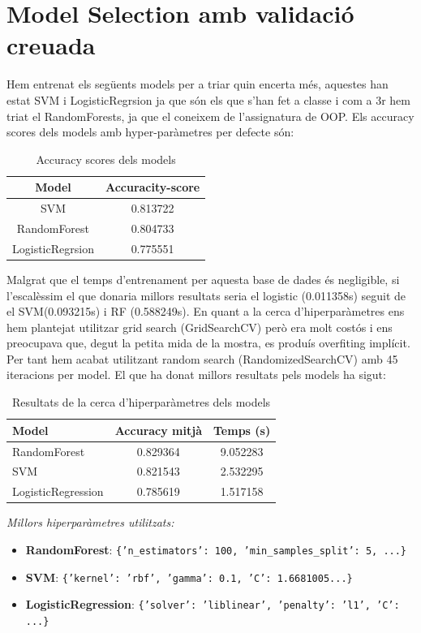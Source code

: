 \documentclass[9pt,a4paper,twoside]{tau-class/tau}
\begin{document}
\section{Model Selection amb validació creuada}
    Hem entrenat els següents models per a triar quin encerta més, aquestes han estat SVM i LogisticRegrsion ja que són els que s'han fet a classe i com a 3r hem triat el RandomForests, ja que el coneixem de l'assignatura de OOP.
    Els accuracy scores dels models amb hyper-paràmetres per defecte són:
\begin{table}[H]
		\centering
		\caption{Accuracy scores dels models}
		\label{tab:accuracy_scores}
			\begin{tabular}{cc}
			\toprule
			\textbf{Model} & \textbf{Accuracity-score}\\
			\midrule
			SVM & 0.813722\\
            RandomForest & 0.804733\\
            LogisticRegrsion & 0.775551\\
            \bottomrule
		\end{tabular}			
	\end{table}
    Malgrat que el temps d'entrenament per aquesta base de dades és negligible, si l'escalèssim el que donaria millors resultats seria el logistic (0.011358s) seguit de el SVM(0.093215s) i RF (0.588249s).
    En quant a la cerca d'hiperparàmetres ens hem plantejat utilitzar grid search (GridSearchCV) però era molt costós i ens preocupava que, degut la petita mida de la mostra, es produís overfiting implícit. Per tant hem acabat utilitzant random search (RandomizedSearchCV) amb 45 iteracions per model.
    El que ha donat millors resultats pels models ha sigut:
\begin{table}[H]
    \centering
    \caption{Resultats de la cerca d'hiperparàmetres dels models}
    \label{tab:hiperparametres}
    \begin{tabular}{lcc}
        \toprule
        \textbf{Model} & \textbf{Accuracy mitjà} & \textbf{Temps (s)} \\
        \midrule
        RandomForest & 0.829364 & 9.052283 \\
        SVM & 0.821543 & 2.532295 \\
        LogisticRegression & 0.785619 & 1.517158 \\
        \bottomrule
    \end{tabular}
\end{table}

\noindent\footnotesize\textit{Millors hiperparàmetres utilitzats:}
\begin{itemize}
    \item \textbf{RandomForest}: \texttt{\{'n\_estimators': 100, 'min\_samples\_split': 5, ...\}}
    \item \textbf{SVM}: \texttt{\{'kernel': 'rbf', 'gamma': 0.1, 'C': 1.6681005...\}}
    \item \textbf{LogisticRegression}: \texttt{\{'solver': 'liblinear', 'penalty': 'l1', 'C': ...\}}
\end{itemize}
\end{document}
